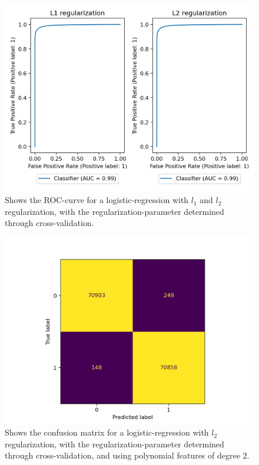 \documentclass{article}
\begin{document}
\begin{figure}
	\centering
	\includegraphics[scale=0.8]{lr_roc_curve}
	\caption{Shows the ROC-curve for a logistic-regression with
		$l_1$ and $l_2$ regularization, with the regularization-parameter
		determined through cross-validation.}
	\label{lrroccurves}
\end{figure}

\begin{figure}
	\centering
	\includegraphics[scale=0.8]{lr_poly_confusion_mat}
	\caption{Shows the confusion matrix for a logistic-regression with
		$l_2$ regularization, with the regularization-parameter
		determined through cross-validation, and using polynomial
		features of degree $2$.}
	\label{lrpolyconfusionmat}
\end{figure}
\end{document}
